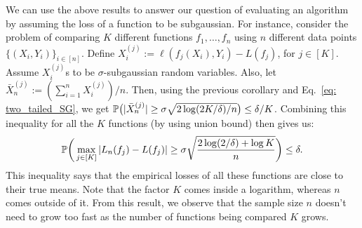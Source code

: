 \documentclass[twoside]{article}
\begin{document}
       
    \begin{remark}
      We can use the above results to answer our question of evaluating an algorithm by assuming the loss of a function to be subgaussian. For instance, consider the problem of comparing $K$ different functions $f_1, \ldots, f_n$ using $n$ different data points $\{(X_i, Y_i)\}_{i \in [n]}$. Define $X_i^{(j)} := \ell (f_j(X_i), Y_i) - L(f_j)$, for $j \in [K]$. Assume $X_i^{(j)}$s to be $\sigma$-subgaussian random variables. Also, let $\bar X^{(j)}_n := (\sum_{i=1}^n X_i^{(j)}) / n$. Then, using the previous corollary and Eq.\ \ref{eq: two_tailed_SG}, we get $\mathbb{P} \big( |\bar X^{(j)}_n| \geq \sigma \sqrt{ 2 \log (2K / \delta) / n} \big) \leq \delta/K$. Combining this inequality for all the $K$ functions (by using union bound) then gives us:
      \begin{align*}
        \mathbb{P} \bigg( \max_{j \in [K]} |L_n(f_j) - L(f_j)| \geq \sigma \sqrt{\frac{2 \log(2 / \delta) + \log K}{n}} \bigg) \leq \delta.
      \end{align*}
       This inequality says that the empirical losses of all these functions are close to their true means. Note that the factor $K$ comes inside a logarithm, whereas $n$ comes outside of it. From this result, we observe that the sample size $n$ doesn't need to grow too fast as the number of functions being compared $K$ grows.
    \end{remark}
   
\end{document}
